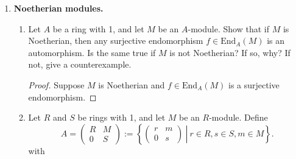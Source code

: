 \documentclass[11pt, reqno]{amsart}
\theoremstyle{plain}
\theoremstyle{definition}
\theoremstyle{example}
\def\End{\mathrm{End}}
\begin{document}
\begin{enumerate}[1.]
\begin{enumerate}
\begin{enumerate}
\end{enumerate}

\end{enumerate}

\item \textbf{Noetherian modules.} 
\begin{enumerate}
\item Let $A$ be a ring with 1, and let $M$ be an $A$-module. Show that if $M$ is Noetherian, then any surjective endomorphism $f \in \End_A(M)$ is an automorphism. Is the same true if $M$ is not Noetherian? If so, why? If not, give a counterexample.
 
\begin{proof}
Suppose $M$ is Noetherian and $f \in \End_A(M)$ is a surjective endomorphism.
\end{proof}

\item Let $R$ and $S$ be rings with 1, and let $M$ be an $R$-module. Define 
$$A = \begin{pmatrix} R & M \\ 0 & S \end{pmatrix} := \left\{\left.\begin{pmatrix}r & m \\ 0 & s \end{pmatrix} ~\right|~ r \in R, s \in S, m \in M\right\}.$$
with


\end{enumerate}
\end{enumerate}
\end{document}

